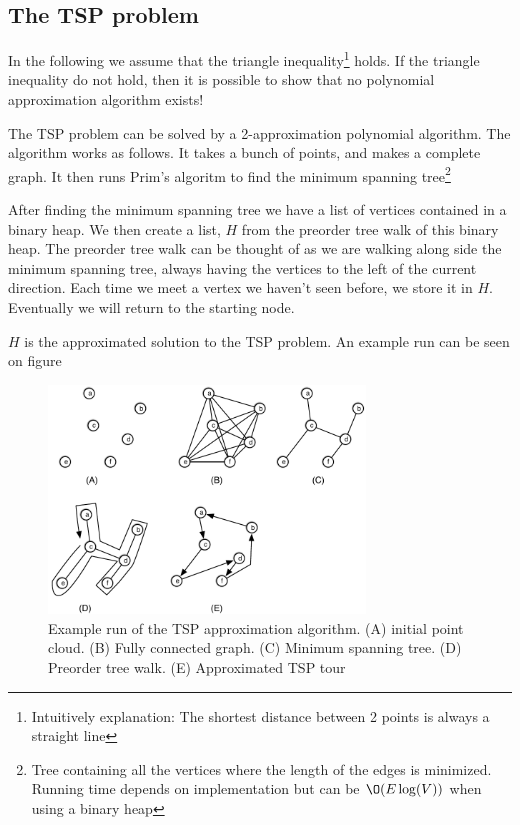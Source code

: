 \documentclass[10pt]{article}
\begin{document}
\subsection{The TSP problem} %
\label{sub:the_tsp_problem}
In the following we assume that the triangle inequality\footnote{Intuitively explanation: The shortest distance between 2 points is always a straight line} holds. If the triangle inequality do not hold, then it is possible to show that no polynomial approximation algorithm exists!

The TSP problem can be solved by a 2-approximation polynomial algorithm. The algorithm works as follows. It takes a bunch of points, and makes a complete graph. It then runs Prim's algoritm to find the minimum spanning tree\footnote{Tree containing all the vertices where the length of the edges is minimized. Running time depends on implementation but can be $\O(E\log(V))$ when using a binary heap}

After finding the minimum spanning tree we have a list of vertices contained in a binary heap. We then create a list, $H$ from the preorder tree walk of this binary heap. The preorder tree walk can be thought of as we are walking along side the minimum spanning tree, always having the vertices to the left of the current direction. Each time we meet a vertex we haven't seen before, we store it in $H$. Eventually we will return to the starting node. 

$H$ is the approximated solution to the TSP problem. An example run can be seen on figure

\begin{figure}[ht]
\centering
\includegraphics[width=0.75\textwidth]{figures/fig14.pdf}
\caption{Example run of the TSP approximation algorithm. (A) initial point cloud. (B) Fully connected graph. (C) Minimum spanning tree. (D) Preorder tree walk. (E) Approximated TSP tour}
\label{fig14}
\end{figure}
\end{document}
